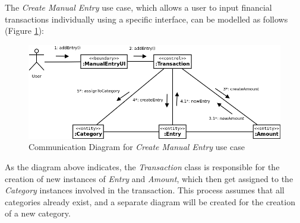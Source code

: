 The \emph{Create Manual Entry} use case, which allows a
user to input financial transactions individually using a specific interface,
can be modelled as follows (Figure \ref{fig:CommDiagram.CreateManualEntry}):
\begin{figure}[ht!]
  \begin{center}
    \includegraphics[width=16cm]{./contents/img/Comm_Diagram_-_Manual_Entry.png}
  \end{center}
  \caption{Communication Diagram for \emph{Create Manual Entry} use case}
  \label{fig:CommDiagram.CreateManualEntry}
\end{figure}
\FloatBarrier

As the diagram above indicates, the \emph{Transaction} class is responsible for
the creation of new instances of \emph{Entry} and \emph{Amount}, which then get
assigned to the \emph{Category} instances involved in the transaction. This
process assumes that all categories already exist, and a separate diagram will
be created for the creation of a new category.

